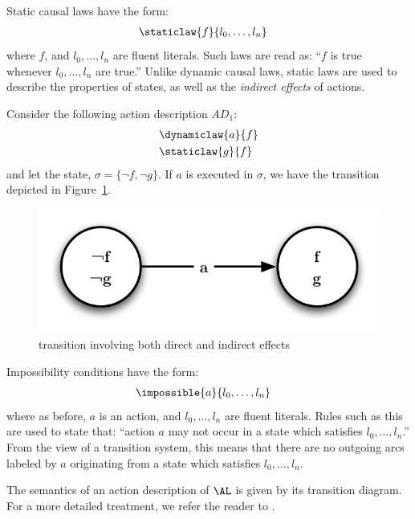 Static causal laws have the form:
\begin{align*}
    &\staticlaw{f}{l_{0},\ldots,l_{n}}
\end{align*}
where $f$, and $l_{0},\ldots,l_{n}$ are fluent literals. Such laws are read as: ``$f$ is true whenever $l_{0},\ldots,l_{n}$ are true.'' Unlike dynamic causal laws, static laws are used to describe the properties of states, as well as the \emph{indirect effects} of actions.
\begin{example}
{\rm
Consider the following action description $AD_{1}$:
\begin{align*}
    &\dynamiclaw{a}{f} \\
    &\staticlaw{g}{f}
\end{align*}
and let the state, $\sigma = \{\neg{f}, \neg{g}\}$. If $a$ is executed in $\sigma$, we have the transition depicted in Figure~\ref{fig-scl}.
\begin{figure}
    \centering
    \includegraphics[scale=0.5]{static-law}
    \caption{transition involving both direct and indirect effects}
    \label{fig-scl}
\end{figure}
}
\end{example}

Impossibility conditions have the form:
\begin{align*}
    &\impossible{a}{l_{0},\ldots,l_{n}}
\end{align*}
where as before, $a$ is an action, and $l_{0},\ldots,l_{n}$ are fluent literals. Rules such as this are used to state that: ``action $a$ may not occur in a state which satisfies $l_{0},\ldots,l_{n}$.'' From the view of a transition system, this means that there are no outgoing arcs labeled by $a$ originating from a state which satisfies $l_{0},\ldots,l_{n}$.

The semantics of an action description of $\AL$ is given by its transition diagram. For a more detailed treatment, we refer the reader to \cite{Bald2005}.

